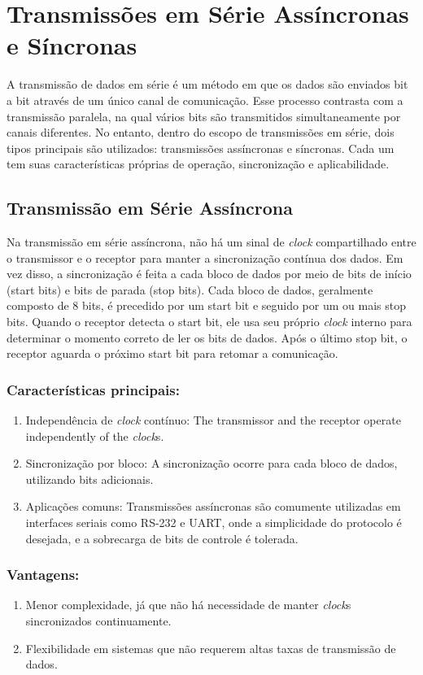 \documentclass[12pt]{article}
\begin{document}
\section{Transmissões em Série Assíncronas e Síncronas}

A transmissão de dados em série é um método em que os dados são enviados bit a bit através de um único canal de comunicação. Esse processo contrasta com a transmissão paralela, na qual vários bits são transmitidos simultaneamente por canais diferentes. No entanto, dentro do escopo de transmissões em série, dois tipos principais são utilizados: transmissões assíncronas e síncronas. Cada um tem suas características próprias de operação, sincronização e aplicabilidade.


\subsection{Transmissão em Série Assíncrona}
Na transmissão em série assíncrona, não há um sinal de \textit{clock} compartilhado entre o transmissor e o receptor para manter a sincronização contínua dos dados. Em vez disso, a sincronização é feita a cada bloco de dados por meio de bits de início (start bits) e bits de parada (stop bits). Cada bloco de dados, geralmente composto de 8 bits, é precedido por um start bit e seguido por um ou mais stop bits. Quando o receptor detecta o start bit, ele usa seu próprio \textit{clock} interno para determinar o momento correto de ler os bits de dados. Após o último stop bit, o receptor aguarda o próximo start bit para retomar a comunicação.

\subsubsection{Características principais:}
\begin{enumerate}
\item Independência de \textit{clock} contínuo: The transmissor and the receptor operate independently of the \textit{clock}s.
\item Sincronização por bloco: A sincronização ocorre para cada bloco de dados, utilizando bits adicionais.
\item Aplicações comuns: Transmissões assíncronas são comumente utilizadas em interfaces seriais como RS-232 e UART, onde a simplicidade do protocolo é desejada, e a sobrecarga de bits de controle é tolerada.
\end{enumerate}

\subsubsection{Vantagens:}
\begin{enumerate}
    \item Menor complexidade, já que não há necessidade de manter \textit{clock}s sincronizados continuamente.
    \item Flexibilidade em sistemas que não requerem altas taxas de transmissão de dados.
\end{enumerate}
\end{document}
